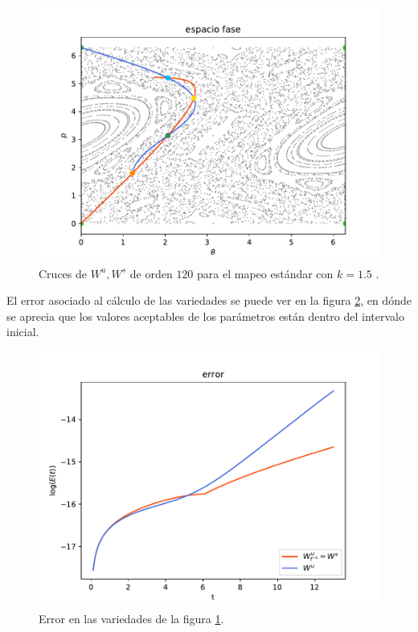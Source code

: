 \begin{figure}[H]
\centering
\includegraphics[scale=0.7]{cruce_estandar}
\caption{Cruces de $W^{u},W^{s}$ de orden $120$ para el mapeo estándar con $k=1.5$ .}
\label{cruce_estandar}
\end{figure}
El error asociado al cálculo de las variedades se puede ver en la figura \ref{errorEstCruces}, en dónde se aprecia que los valores aceptables de los parámetros están dentro del intervalo inicial. 

\begin{figure}[H]
\centering
\includegraphics[scale=0.7]{error_cruces_estandar}
\caption{Error en las variedades de la figura \ref{cruce_estandar}.}
\label{errorEstCruces}
\end{figure}


